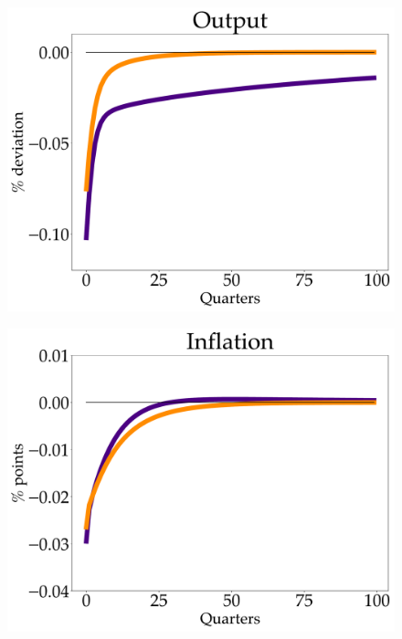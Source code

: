 \begin{figure}[!h]
\begin{minipage}{0.33\textwidth}
  \includegraphics[scale=.14]{text/chapter1/Figures/Y_IPR}
  \label{fig:3}
\end{minipage}
\begin{minipage}{0.33\textwidth}
  \includegraphics[scale=.14]{text/chapter1/Figures/pi_IPR}
  \label{fig:4}
\end{minipage}
\medskip
\begin{minipage}{0.33\textwidth}

\end{minipage}
\end{figure}
